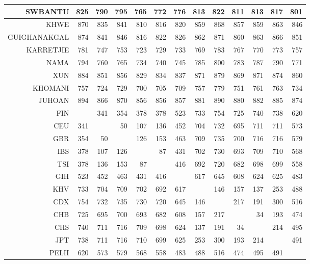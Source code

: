 \begin{longtable}{rrrrrrrrrrrrr}
  SWBANTU & 825 & 790 & 795 & 765 & 772 & 776 & 813 & 822 & 811 & 813 & 817 & 801 \\ 
   \hline 
KHWE & 870 & 835 & 841 & 810 & 816 & 820 & 859 & 868 & 857 & 859 & 863 & 846 \\ 
  GUIGHANAKGAL & 874 & 841 & 846 & 816 & 822 & 826 & 862 & 871 & 860 & 863 & 866 & 851 \\ 
  KARRETJIE & 781 & 747 & 753 & 723 & 729 & 733 & 769 & 783 & 767 & 770 & 773 & 757 \\ 
  NAMA & 794 & 760 & 765 & 734 & 740 & 745 & 785 & 800 & 783 & 787 & 790 & 771 \\ 
  XUN & 884 & 851 & 856 & 829 & 834 & 837 & 871 & 879 & 869 & 871 & 874 & 860 \\ 
  KHOMANI & 757 & 724 & 729 & 700 & 705 & 709 & 757 & 779 & 751 & 761 & 763 & 734 \\ 
  JUHOAN & 894 & 866 & 870 & 856 & 856 & 857 & 881 & 890 & 880 & 882 & 885 & 874 \\ 
   \hline 
FIN &  & 341 & 354 & 378 & 378 & 523 & 733 & 754 & 725 & 740 & 738 & 620 \\ 
  CEU & 341 &  & 50 & 107 & 136 & 452 & 704 & 732 & 695 & 711 & 711 & 573 \\ 
  GBR & 354 & 50 &  & 126 & 153 & 463 & 709 & 735 & 700 & 716 & 716 & 579 \\ 
  IBS & 378 & 107 & 126 &  & 87 & 431 & 702 & 730 & 693 & 709 & 710 & 568 \\ 
  TSI & 378 & 136 & 153 & 87 &  & 416 & 692 & 720 & 682 & 698 & 699 & 558 \\ 
  GIH & 523 & 452 & 463 & 431 & 416 &  & 617 & 645 & 608 & 624 & 625 & 483 \\ 
  KHV & 733 & 704 & 709 & 702 & 692 & 617 &  & 146 & 157 & 137 & 253 & 488 \\ 
  CDX & 754 & 732 & 735 & 730 & 720 & 645 & 146 &  & 217 & 191 & 300 & 516 \\ 
  CHB & 725 & 695 & 700 & 693 & 682 & 608 & 157 & 217 &  & 34 & 193 & 474 \\ 
  CHS & 740 & 711 & 716 & 709 & 698 & 624 & 137 & 191 & 34 &  & 214 & 495 \\ 
  JPT & 738 & 711 & 716 & 710 & 699 & 625 & 253 & 300 & 193 & 214 &  & 491 \\ 
  PELII & 620 & 573 & 579 & 568 & 558 & 483 & 488 & 516 & 474 & 495 & 491 &  \\ 
   \bottomrule
\end{longtable}
